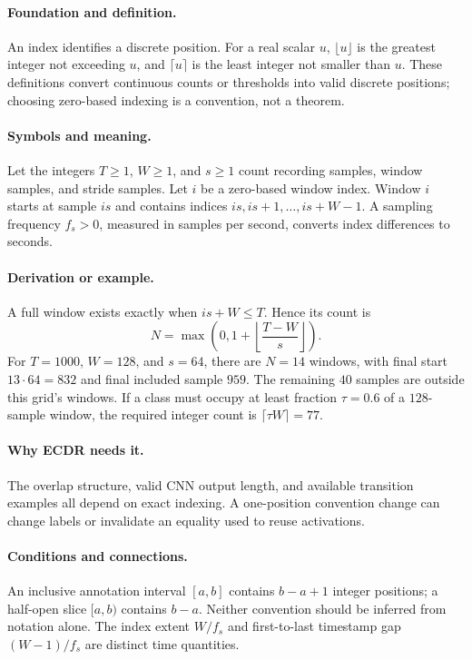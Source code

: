 \paragraph{Foundation and definition.}
An index identifies a discrete position. For a real scalar $u$,
$\lfloor u\rfloor$ is the greatest integer not exceeding $u$, and
$\lceil u\rceil$ is the least integer not smaller than $u$. These
definitions convert continuous counts or thresholds into valid discrete
positions; choosing zero-based indexing is a convention, not a theorem.
\paragraph{Symbols and meaning.}
Let the integers $T\ge1$, $W\ge1$, and $s\ge1$ count recording samples,
window samples, and stride samples. Let $i$ be a zero-based window index.
Window $i$ starts at sample $is$ and contains indices
$is,is+1,\ldots,is+W-1$. A sampling frequency $f_s>0$, measured in
samples per second, converts index differences to seconds.
\paragraph{Derivation or example.}
A full window exists exactly when $is+W\le T$. Hence its count is
\[
 N=\max\!\left(0,1+\left\lfloor\frac{T-W}{s}\right\rfloor\right).
\]
For $T=1000$, $W=128$, and $s=64$, there are $N=14$ windows, with
final start $13\cdot64=832$ and final included sample $959$.
The remaining $40$ samples are outside this grid's windows. If a class
must occupy at least fraction $\tau=0.6$ of a $128$-sample window,
the required integer count is $\lceil\tau W\rceil=77$.
\paragraph{Why ECDR needs it.}
The overlap structure, valid CNN output length, and available transition
examples all depend on exact indexing. A one-position convention change
can change labels or invalidate an equality used to reuse activations.
\paragraph{Conditions and connections.}
An inclusive annotation interval $[a,b]$ contains $b-a+1$ integer
positions; a half-open slice $[a,b)$ contains $b-a$. Neither convention
should be inferred from notation alone. The index extent $W/f_s$ and
first-to-last timestamp gap $(W-1)/f_s$ are distinct time quantities.

